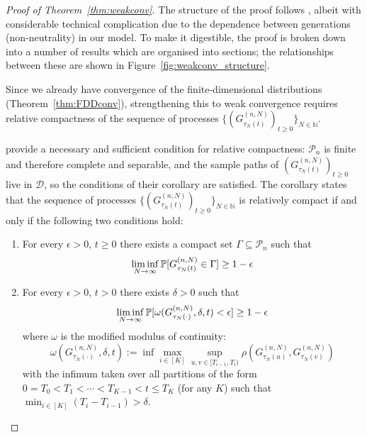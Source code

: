 \begin{proof}[Proof of Theorem~\ref{thm:weakconv}]
The structure of the proof follows \textcite{mohle1999}, albeit with considerable technical complication due to the dependence between generations (non-neutrality) in our model.
To make it digestible, the proof is broken down into a number of results which are organised into sections; the relationships between these are shown in Figure~\ref{fig:weakconv_structure}.

Since we already have convergence of the finite-dimensional distributions (Theorem~\ref{thm:FDDconv}), strengthening this to weak convergence requires relative compactness of the sequence of processes $\{ (G_{\tau_N(t)}^{(n,N)})_{t\geq0} \}_{N\in\mathbb{N}}$.

\textcite[Chapter 3, Corollary 7.4]{ethier1986} provide a necessary and sufficient condition for relative compactness: $\mathcal{P}_n$ is finite and therefore complete and separable, and the sample paths of $(G_{\tau_N(t)}^{(n,N)})_{t\geq0}$ live in $\mathcal{D}$, so the conditions of their corollary are satisfied.
The corollary states that the sequence of processes $\{ (G_{\tau_N(t)}^{(n,N)})_{t\geq0} \}_{N\in\mathbb{N}}$ is relatively compact if and only if the following two conditions hold:
\begin{enumerate}
\item \label{item:relcomp1} For every $\epsilon>0$, $t\geq 0$ there exists a compact set $\Gamma \subseteq \mathcal{P}_n$ such that
\begin{equation*}
\liminf_{N\to\infty} \mathbb{P}[ G_{\tau_N(t)}^{(n,N)} \in \Gamma ] 
\geq 1-\epsilon
\end{equation*}
\item \label{item:relcomp2} For every $\epsilon>0$, $t>0$ there exists $\delta>0$ such that
\begin{equation*}
\liminf_{N\to\infty} \mathbb{P}[ \omega(G_{\tau_N(\cdot)}^{(n,N)}, \delta, t) < \epsilon ] 
\geq 1-\epsilon
\end{equation*}
where $\omega$ is the modified modulus of continuity:
\begin{equation*}
\omega(G_{\tau_N(\cdot)}^{(n,N)}, \delta, t) := \inf \max_{i \in [K]} 
        \sup_{u,v \in [T_{i-1}, T_i)} \rho\left( 
        G_{\tau_N(u)}^{(n,N)}, G_{\tau_N(v)}^{(n,N)} \right)
\end{equation*}
with the infimum taken over all partitions of the form $0=T_0<T_1<\cdots <T_{K-1} <t \leq T_K$ (for any $K$) such that $\min_{i\in[K]} (T_i - T_{i-1}) > \delta$. 
\end{enumerate}

\end{proof}
